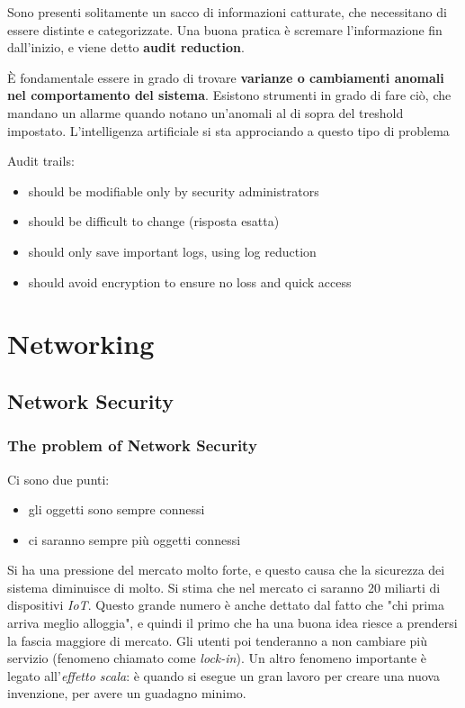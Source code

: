 Sono presenti solitamente un sacco di informazioni catturate, che necessitano 
di essere distinte e categorizzate.
Una buona pratica è scremare l'informazione fin dall'inizio, e viene detto 
\textbf{audit reduction}.

È fondamentale essere in grado di trovare \textbf{varianze o cambiamenti 
anomali nel comportamento del sistema}. Esistono strumenti in grado di fare 
ciò, che mandano un allarme quando notano un'anomali al di sopra del treshold 
impostato. L'intelligenza artificiale si sta approciando a questo tipo di 
problema



Audit trails:
\begin{itemize}
 \item should be modifiable only by security administrators
 \item should be difficult to change (risposta esatta)
 \item should only save important logs, using log reduction
 \item should avoid encryption to ensure no loss and quick access
\end{itemize}

\part{Networking}

\chapter{Network Security}

\section{The problem of Network Security}

Ci sono due punti:

\begin{itemize}
\item gli oggetti sono sempre connessi
\item ci saranno sempre più oggetti connessi
\end{itemize}

Si ha una pressione del mercato molto forte, e questo causa che la sicurezza 
dei sistema diminuisce di molto. Si stima che nel mercato ci saranno 20 
miliarti di dispositivi \textit{IoT}. Questo grande numero è anche dettato dal 
fatto che "chi prima arriva meglio alloggia", e quindi il primo che ha una 
buona idea riesce a prendersi la fascia maggiore di mercato. Gli utenti poi 
tenderanno a non cambiare più servizio (fenomeno chiamato come 
\textit{lock-in}). Un altro fenomeno importante è legato all'\textit{effetto 
scala}: è quando si esegue un gran lavoro per creare una nuova invenzione, per 
avere un guadagno minimo.

